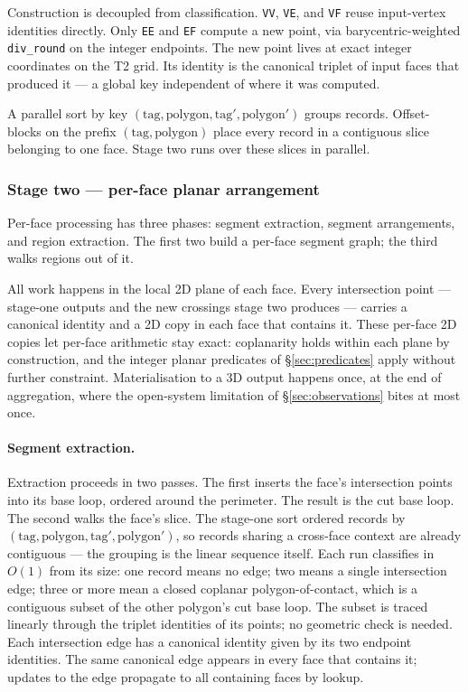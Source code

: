 \documentclass{egpubl}
\begin{document}
Construction is decoupled from classification. \texttt{VV}, \texttt{VE}, and \texttt{VF} reuse input-vertex identities directly. Only \texttt{EE} and \texttt{EF} compute a new point, via barycentric-weighted \texttt{div\_round} on the integer endpoints. The new point lives at exact integer coordinates on the T2 grid. Its identity is the canonical triplet of input faces that produced it --- a global key independent of where it was computed.

A parallel sort by key $(\text{tag}, \text{polygon}, \text{tag}', \text{polygon}')$ groups records. Offset-blocks on the prefix $(\text{tag}, \text{polygon})$ place every record in a contiguous slice belonging to one face. Stage two runs over these slices in parallel.

\subsubsection*{Stage two --- per-face planar arrangement}

Per-face processing has three phases: segment extraction, segment arrangements, and region extraction. The first two build a per-face segment graph; the third walks regions out of it.

All work happens in the local 2D plane of each face. Every intersection point --- stage-one outputs and the new crossings stage two produces --- carries a canonical identity and a 2D copy in each face that contains it. These per-face 2D copies let per-face arithmetic stay exact: coplanarity holds within each plane by construction, and the integer planar predicates of \S\ref{sec:predicates} apply without further constraint. Materialisation to a 3D output happens once, at the end of aggregation, where the open-system limitation of \S\ref{sec:observations} bites at most once.

\paragraph{Segment extraction.}
Extraction proceeds in two passes. The first inserts the face's intersection points into its base loop, ordered around the perimeter. The result is the cut base loop. The second walks the face's slice. The stage-one sort ordered records by $(\text{tag}, \text{polygon}, \text{tag}', \text{polygon}')$, so records sharing a cross-face context are already contiguous --- the grouping is the linear sequence itself. Each run classifies in $O(1)$ from its size: one record means no edge; two means a single intersection edge; three or more mean a closed coplanar polygon-of-contact, which is a contiguous subset of the other polygon's cut base loop. The subset is traced linearly through the triplet identities of its points; no geometric check is needed. Each intersection edge has a canonical identity given by its two endpoint identities. The same canonical edge appears in every face that contains it; updates to the edge propagate to all containing faces by lookup.
\end{document}
